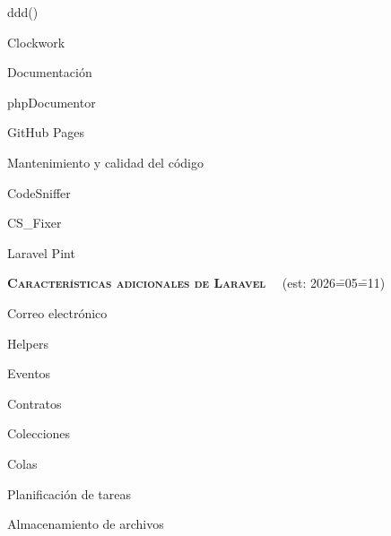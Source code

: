 \begin{longenum}
\begin{longenum}
\begin{longenum}
            \item ddd()
            \item Clockwork
        \end{longenum}
        \item Documentación
        \begin{longenum}
            \item phpDocumentor
            \item GitHub Pages
        \end{longenum}
        \item Mantenimiento y calidad del código
        \begin{longenum}
            \item CodeSniffer
            \item CS\_Fixer
            \begin{longenum}
                \item Laravel Pint
            \end{longenum}
        \end{longenum}
    \end{longenum}
    \item \textbf{\textsc{Características adicionales de Laravel}} \ \opcional\ (est: 2026\==05\==11)
    \begin{longenum}
        \item Correo electrónico
        \item Helpers
        \item Eventos
        \item Contratos
        \item Colecciones
        \item Colas
        \item Planificación de tareas
        \item Almacenamiento de archivos
    \end{longenum}
\end{longenum}
